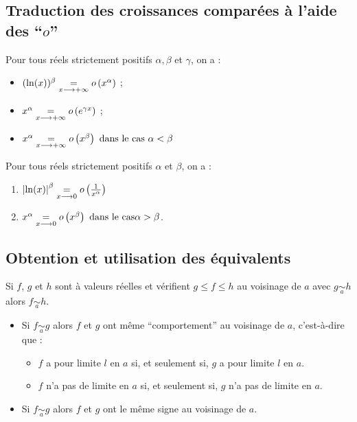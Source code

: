 \subsection{Traduction des croissances comparées à l’aide des “\(o\)”}

\begin{defprop}
    Pour tous réels strictement positifs \(\alpha, \beta\) et \(\gamma\), on a :
    \begin{itemize}
        \item \((\ln(x))^{\beta} \underset{x\longrightarrow +\infty}{=}o \left(x^{\alpha}\right)\) ;
        \item \(x^{\alpha} \underset{x\longrightarrow +\infty}{=} o \left(e^{\gamma x}\right)\) ;
        \item \( x^{\alpha} \underset{x\longrightarrow +\infty}{=} o \left( x^{\beta}\right) \text{ dans le cas } \alpha < \beta\)
    \end{itemize}


\end{defprop}

\begin{defprop}[Au voisinage de \(0\)]
    Pour tous réels strictement positifs \(\alpha\) et \(\beta\), on a :
    \begin{enumerate}
        \item \(\left\lvert\ln(x)\right\rvert^{\beta} \underset{x\longrightarrow 0}{=} o \left(\frac{1}{x^{\alpha}}\right)\)
        \item \(x^{\alpha} \underset{x\longrightarrow 0}{=} o\left( x^{\beta}\right) \text{ dans le cas} \alpha > \beta\).
    \end{enumerate}
\end{defprop}

\subsection{Obtention et utilisation des équivalents}

\begin{defprop}
    Si \(f\), \(g\) et \(h\) sont à valeurs réelles et vérifient \(g \leq f \leq h\) au voisinage de \(a\) avec \( g \underset{a}{\sim} h \) alors \( f \underset{a}{\sim} h \).
\end{defprop}

\begin{defprop}
    \begin{itemize}
        \item Si \(f\underset{a}{\sim} g\) alors \(f\) et \(g\) ont même “comportement” au voisinage de \(a\), c’est-à-dire que :
        \begin{itemize}
            \item \(f\) a pour limite \(l\) en \(a\) si, et seulement si, \(g\) a pour limite \(l\) en \(a\).
            \item \(f\) n’a pas de limite en \(a\) si, et seulement si, \(g\) n’a pas de limite en \(a\).
        \end{itemize}
        \item Si \(f \underset{a}{\sim} g\) alors \(f\) et \(g\) ont le même signe au voisinage de \(a\).
    \end{itemize}
\end{defprop}

